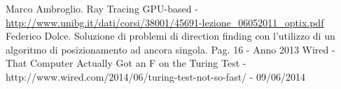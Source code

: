 \begin{thebibliography}{10}
\fancyfoot[C]{\thepage } 
Marco Ambroglio. Ray Tracing GPU-based - \url{http://www.unibg.it/dati/corsi/38001/45691-lezione_06052011_optix.pdf}
Federico Dolce. Soluzione di problemi di direction finding con l'utilizzo di un algoritmo di posizionamento ad ancora singola. Pag. 16 - Anno 2013
Wired - That Computer Actually Got an F on the Turing Test - http://www.wired.com/2014/06/turing-test-not-so-fast/ - 09/06/2014
\end{thebibliography}
